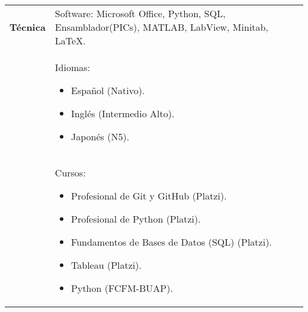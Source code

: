 \documentclass[twoside,letter,openright,10pt]{report}
\begin{document}
\begin{table}[hbt!]
\begin{tabular}{p{40mm}p{140mm}}
\\
\textbf{Técnica}
& Software: Microsoft Office, Python, SQL, Ensamblador(PICs), MATLAB, LabView, Minitab, \LaTeX{}.
\\
& Idiomas:
\begin{itemize}[noitemsep,nolistsep]
\item Español (Nativo).
\item Inglés (Intermedio Alto).
\item Japonés (N5).
\vspace{-4mm}
\end{itemize}
\\
& Cursos:
\begin{itemize}[noitemsep,nolistsep]
\item Profesional de Git y GitHub (Platzi).
\item Profesional de Python (Platzi).
\item Fundamentos de Bases de Datos (SQL) (Platzi).
\item Tableau (Platzi).
\item Python (FCFM-BUAP).
\vspace{-4mm}
\end{itemize}
\end{tabular}
\end{table}
\end{document}
